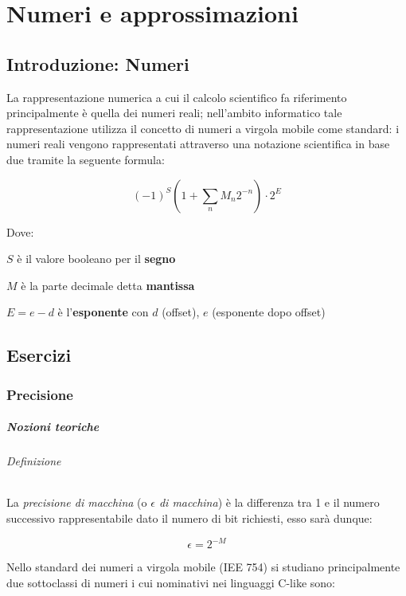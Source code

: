 \setchapterpreamble[u]{\margintoc}
\chapter{Numeri e approssimazioni}

\section{Introduzione: Numeri}

La rappresentazione numerica a cui il calcolo scientifico fa riferimento principalmente
è quella dei numeri reali; nell’ambito informatico tale rappresentazione utilizza
il concetto di numeri a virgola mobile come standard: i numeri reali vengono
rappresentati attraverso una notazione scientifica in base due tramite la seguente formula:

$$
	(-1)^S \left( 1 + \sum_n M_n 2^{-n} \right) \cdot 2^{E}
$$

Dove:
\begin{description}
	\item $S$ è il valore booleano per il \textbf{segno}
	\item $M$ è la parte decimale detta \textbf{mantissa}

	\item $E = e - d$ è l'\textbf{esponente} con $d$ (offset), $e$ (esponente dopo offset)
\end{description}

\section{Esercizi}

\subsection{Precisione}

\paragraph{Nozioni teoriche}

\subparagraph{Definizione} La \textit{precisione di macchina} (o \textit{$\epsilon$ di macchina})
è la differenza tra 1 e il numero successivo rappresentabile dato il numero di bit
richiesti, esso sarà dunque:

$$
	\epsilon = 2^{-M}
$$

Nello standard dei numeri a virgola mobile (IEE 754) si studiano principalmente
due sottoclassi di numeri i cui nominativi nei linguaggi C-like sono:

